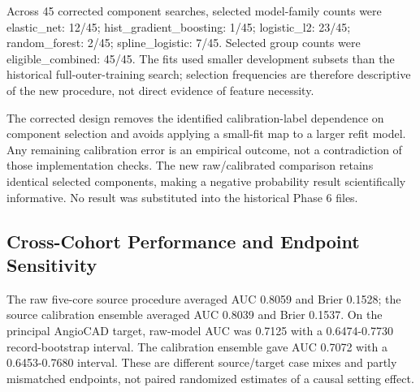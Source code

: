 \documentclass[conference,10pt]{IEEEtran}
\begin{document}
Across 45 corrected component searches, selected model-family counts were elastic\_net: 12/45; hist\_gradient\_boosting: 1/45; logistic\_l2: 23/45; random\_forest: 2/45; spline\_logistic: 7/45. Selected group counts were eligible\_combined: 45/45. The fits used smaller development subsets than the historical full-outer-training search; selection frequencies are therefore descriptive of the new procedure, not direct evidence of feature necessity.

The corrected design removes the identified calibration-label dependence on component selection and avoids applying a small-fit map to a larger refit model. Any remaining calibration error is an empirical outcome, not a contradiction of those implementation checks. The new raw/calibrated comparison retains identical selected components, making a negative probability result scientifically informative. No result was substituted into the historical Phase 6 files.

\subsection{Cross-Cohort Performance and Endpoint Sensitivity}
The raw five-core source procedure averaged AUC 0.8059 and Brier 0.1528; the source calibration ensemble averaged AUC 0.8039 and Brier 0.1537. On the principal AngioCAD target, raw-model AUC was 0.7125 with a 0.6474-0.7730 record-bootstrap interval. The calibration ensemble gave AUC 0.7072 with a 0.6453-0.7680 interval. These are different source/target case mixes and partly mismatched endpoints, not paired randomized estimates of a causal setting effect.
\end{document}
